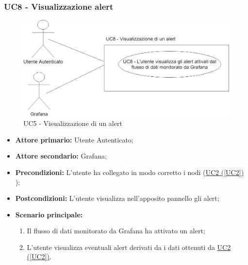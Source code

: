 \pagebreak

\subsubsection{UC8 - Visualizzazione alert}\label{UC8}

\begin{figure}[H]
	\centering
	\includegraphics[scale=0.4]{./images/UC8.png}
	\caption{UC5 - Visualizzazione di un alert}
\end{figure}

\begin{itemize}
	\item \textbf{Attore primario:} Utente Autenticato;
	\item \textbf{Attore secondario:} Grafana;
	\item \textbf{Precondizioni:} L'utente ha collegato in modo corretto i nodi (\hyperref[UC2]{UC2 (\ref*{UC2})} );
	\item \textbf{Postcondizioni:} L'utente visualizza nell'apposito pannello gli alert;
	\item \textbf{Scenario principale:}
	\begin{enumerate}
		\item Il flusso di dati monitorato da Grafana ha attivato un alert;
		\item L'utente visualizza eventuali alert derivati da i dati ottenuti da  \hyperref[UC2]{UC2 (\ref*{UC2})}.
	\end{enumerate}
\end{itemize}
